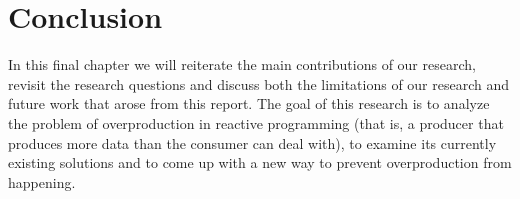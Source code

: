 \chapter{Conclusion}

In this final chapter we will reiterate the main contributions of our research, revisit the research questions and discuss both the limitations of our research and future work that arose from this report. The goal of this research is to analyze the problem of overproduction in reactive programming (that is, a producer that produces more data than the consumer can deal with), to examine its currently existing solutions and to come up with a new way to prevent overproduction from happening.






